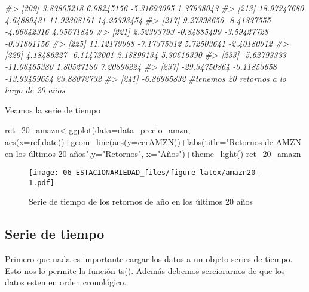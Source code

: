 \documentclass[
]{book}
\newenvironment{Shaded}{\begin{snugshade}}{\end{snugshade}}
\newcommand{\AttributeTok}[1]{\textcolor[rgb]{0.77,0.63,0.00}{#1}}
\newcommand{\CommentTok}[1]{\textcolor[rgb]{0.56,0.35,0.01}{\textit{#1}}}
\newcommand{\FunctionTok}[1]{\textcolor[rgb]{0.00,0.00,0.00}{#1}}
\newcommand{\NormalTok}[1]{#1}
\newcommand{\OtherTok}[1]{\textcolor[rgb]{0.56,0.35,0.01}{#1}}
\newcommand{\SpecialCharTok}[1]{\textcolor[rgb]{0.00,0.00,0.00}{#1}}
\newcommand{\StringTok}[1]{\textcolor[rgb]{0.31,0.60,0.02}{#1}}
\begin{document}
\begin{Shaded}
\begin{Highlighting}[]
\CommentTok{\#\textgreater{} [209]   3.83805218   6.98245156  {-}5.31693095   1.37938043}
\CommentTok{\#\textgreater{} [213]  18.97247680   4.64889431  11.92308161  14.25393454}
\CommentTok{\#\textgreater{} [217]   9.27398656  {-}8.41337555  {-}4.66642316   4.05671846}
\CommentTok{\#\textgreater{} [221]   2.52393793  {-}0.84885499  {-}3.59427728  {-}0.31861156}
\CommentTok{\#\textgreater{} [225]  11.12179968  {-}7.17375312   5.72503641  {-}2.40180912}
\CommentTok{\#\textgreater{} [229]   4.18486227  {-}6.11473001   2.18899134   5.30616390}
\CommentTok{\#\textgreater{} [233]  {-}5.62793333 {-}11.06465380   1.80527180   7.20896224}
\CommentTok{\#\textgreater{} [237] {-}29.34750864  {-}0.11853658 {-}13.99459654  23.88072732}
\CommentTok{\#\textgreater{} [241]  {-}6.86965832}
\CommentTok{\#tenemos 20 retornos a lo largo de 20 años}
\end{Highlighting}
\end{Shaded}

Veamos la serie de tiempo

\begin{Shaded}
\begin{Highlighting}[]
\NormalTok{ret\_20\_amazn}\OtherTok{\textless{}{-}}\FunctionTok{ggplot}\NormalTok{(}\AttributeTok{data=}\NormalTok{data\_precio\_amzn, }\FunctionTok{aes}\NormalTok{(}\AttributeTok{x=}\NormalTok{ref.date))}\SpecialCharTok{+}\FunctionTok{geom\_line}\NormalTok{(}\FunctionTok{aes}\NormalTok{(}\AttributeTok{y=}\NormalTok{ccrAMZN))}\SpecialCharTok{+}\FunctionTok{labs}\NormalTok{(}\AttributeTok{title=}\StringTok{"Retornos de AMZN en los últimos 20 años"}\NormalTok{,}\AttributeTok{y=}\StringTok{"Retornos"}\NormalTok{, }\AttributeTok{x=}\StringTok{"Años"}\NormalTok{)}\SpecialCharTok{+}\FunctionTok{theme\_light}\NormalTok{()}
\NormalTok{ret\_20\_amazn}
\end{Highlighting}
\end{Shaded}

\begin{figure}
\centering
\texttt{[image: 06-ESTACIONARIEDAD\_files/figure-latex/amazn20-1.pdf]}
\caption{\label{fig:amazn20}Serie de tiempo de los retornos de año en los últimos 20 años}
\end{figure}

\hypertarget{serie-de-tiempo}{%
\subsection{Serie de tiempo}\label{serie-de-tiempo}}

Primero que nada es importante cargar los datos a un objeto series de tiempo. Esto nos lo permite la función ts().
Además debemos serciorarnos de que los datos esten en orden cronológico.
\end{document}
